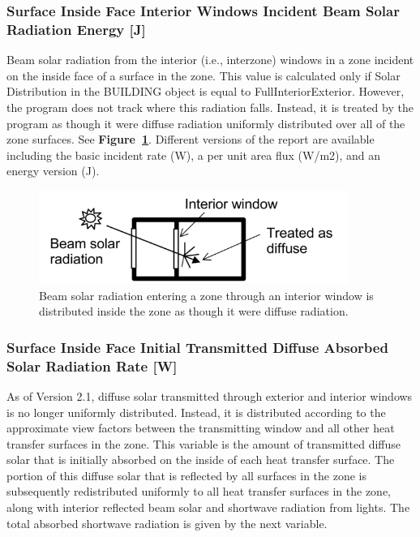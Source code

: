 \subsubsection{Surface Inside Face Interior Windows Incident Beam Solar Radiation Energy {[}J{]}}\label{surface-inside-face-interior-windows-incident-beam-solar-radiation-energy-j}

Beam solar radiation from the interior (i.e., interzone) windows in a zone incident on the inside face of a surface in the zone. This value is calculated only if Solar Distribution in the BUILDING object is equal to FullInteriorExterior. However, the program does not track where this radiation falls. Instead, it is treated by the program as though it were diffuse radiation uniformly distributed over all of the zone surfaces. See \textbf{Figure~\ref{fig:beam-solar-radiation-entering-a-zone-through}}. Different versions of the report are available including the basic incident rate (W), a per unit area flux (W/m2), and an energy version (J).

\begin{figure}[hbtp] %
\centering
\includegraphics[width=0.9\textwidth, height=0.9\textheight, keepaspectratio=true]{media/image057.png}
\caption{Beam solar radiation entering a zone through an interior window is distributed inside the zone as though it were diffuse radiation. \protect \label{fig:beam-solar-radiation-entering-a-zone-through}}
\end{figure}

\subsubsection{Surface Inside Face Initial Transmitted Diffuse Absorbed Solar Radiation Rate {[}W{]}}\label{surface-inside-face-initial-transmitted-diffuse-absorbed-solar-radiation-rate-w}

As of Version 2.1, diffuse solar transmitted through exterior and interior windows is no longer uniformly distributed. Instead, it is distributed according to the approximate view factors between the transmitting window and all other heat transfer surfaces in the zone. This variable is the amount of transmitted diffuse solar that is initially absorbed on the inside of each heat transfer surface. The portion of this diffuse solar that is reflected by all surfaces in the zone is subsequently redistributed uniformly to all heat transfer surfaces in the zone, along with interior reflected beam solar and shortwave radiation from lights. The total absorbed shortwave radiation is given by the next variable.

